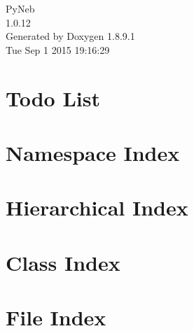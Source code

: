 \documentclass[twoside]{book}
\newcommand{\+}{\discretionary{\mbox{\scriptsize$\hookleftarrow$}}{}{}}
\newcommand{\clearemptydoublepage}{%
  \newpage{\pagestyle{empty}\cleardoublepage}%
}
\begin{document}
\hypersetup{pageanchor=false,
             bookmarks=true,
             bookmarksnumbered=true,
             pdfencoding=unicode
            }
\begin{titlepage}
\vspace*{7cm}
\begin{center}%
{\Large Py\+Neb \\[1ex]\large 1.\+0.\+12 }\\
\vspace*{1cm}
{\large Generated by Doxygen 1.8.9.1}\\
\vspace*{0.5cm}
{\small Tue Sep 1 2015 19:16:29}\\
\end{center}
\end{titlepage}
\clearemptydoublepage
\tableofcontents
\clearemptydoublepage
{}
\hypersetup{pageanchor=true}

\chapter{Todo List}
\label{todo}
\hypertarget{todo}{}

\chapter{Namespace Index}

\chapter{Hierarchical Index}

\chapter{Class Index}

\chapter{File Index}

\end{document}
